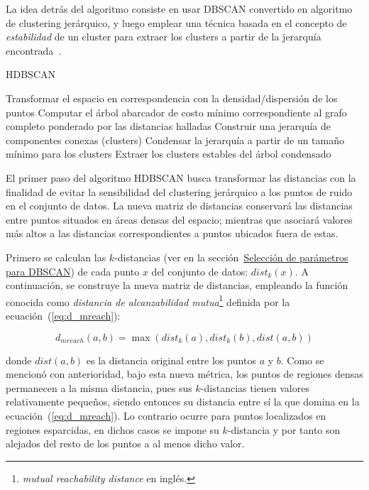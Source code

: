 La idea detrás del algoritmo consiste en usar DBSCAN convertido en algoritmo de clustering jerárquico, y luego emplear una técnica basada en el concepto de \textit{estabilidad} de un cluster para extraer los clusters a partir de la jerarquía encontrada~\cite{McInnes17}.

\begin{algorithm}
    \caption{HDBSCAN}
    \label{algorithm:HDBSCAN}
    Transformar el espacio en correspondencia con la densidad/dispersión de los puntos\;
    Computar el árbol abarcador de costo mínimo correspondiente al grafo completo ponderado por las distancias halladas\;
    Construir una jerarquía de componentes conexas (clusters)\;
    Condensar la jerarquía a partir de un tamaño mínimo para los clusters\;
    Extraer los clusters estables del árbol condensado\;
\end{algorithm}

El primer paso del algoritmo HDBSCAN busca transformar las distancias con la finalidad de evitar la sensibilidad del clustering jerárquico a los puntos de ruido en el conjunto de datos.
La nueva matriz de distancias conservará las distancias entre puntos situados en áreas densas del espacio;
mientras que asociará valores más altos a las distancias correspondientes a puntos ubicados fuera de estas.

Primero se calculan las $k$-distancias (ver en la sección~\hyperref[subsubsec:paramsDBSCAN]{Selección de parámetros para DBSCAN}) de cada punto $x$ del conjunto de datos: $dist_k(x)$.
A continuación, se construye la nueva matriz de distancias, empleando la función conocida como \textit{distancia de alcanzabilidad mutua}\footnote{\textit{mutual reachability distance} en inglés.} definida por la ecuación~(\ref{eq:d_mreach}):

\begin{equation}
    \label{eq:d_mreach}
    d_{mreach}(a,b)=\max(dist_k(a), dist_k(b), dist(a,b))
\end{equation}

\noindent
donde $dist(a,b)$ es la distancia original entre los puntos $a$ y $b$.
Como se mencionó con anterioridad, bajo esta nueva métrica, los puntos de regiones densas permanecen a la misma distancia, pues sus $k$-distancias tienen valores relativamente pequeños, siendo entonces su distancia entre sí la que domina en la ecuación~(\ref{eq:d_mreach}).
Lo contrario ocurre para puntos localizados en regiones esparcidas, en dichos casos se impone su $k$-distancia y por tanto son alejados del resto de los puntos a al menos dicho valor.


